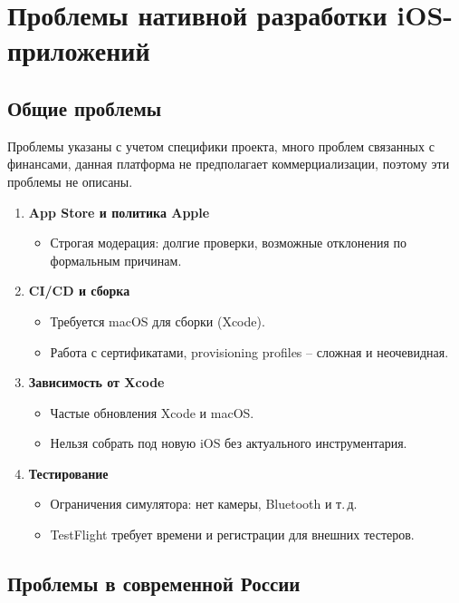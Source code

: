 \chapter{Проблемы нативной разработки iOS-приложений}\label{ch:---ios-}

\section{Общие проблемы}\label{sec:ios}
Проблемы указаны с учетом специфики проекта, много проблем связанных с финансами, данная платформа не предполагает коммерциализации, поэтому эти проблемы не описаны.

\begin{enumerate}
    \item \textbf{App Store и политика Apple}
    \begin{itemize}
        \item Строгая модерация: долгие проверки, возможные отклонения по формальным причинам.
    \end{itemize}


    \item \textbf{CI/CD и сборка}
    \begin{itemize}
        \item Требуется macOS для сборки (Xcode)\@.
        \item Работа с сертификатами, provisioning profiles -- сложная и неочевидная.
    \end{itemize}

    \item \textbf{Зависимость от Xcode}
    \begin{itemize}
        \item Частые обновления Xcode и macOS\@.
        \item Нельзя собрать под новую iOS без актуального инструментария.
    \end{itemize}

    \item \textbf{Тестирование}
    \begin{itemize}
        \item Ограничения симулятора: нет камеры, Bluetooth и т.\,д.
        \item TestFlight требует времени и регистрации для внешних тестеров.
    \end{itemize}

\end{enumerate}

\section{Проблемы в современной России}\label{sec:--ios---}

